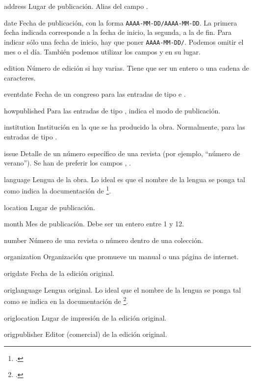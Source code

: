 \begin{choix}
	\item[address]
	Lugar de publicación. Alias del campo .
	\item[date]
	Fecha de publicación, con la forma \verb|AAAA-MM-DD/AAAA-MM-DD|.
	La primera fecha indicada corresponde a la fecha de inicio, la
        segunda, a la de fin. Para indicar sólo una fecha de inicio,
        hay que poner \verb|AAAA-MM-DD/|.
	Podemos omitir el mes o el día. También podemos utilizar los
        campos  y  en su lugar.
   	\item[edition]
	Número de edición si hay varias. Tiene que ser un entero o una
        cadena de caracteres.
      \item[eventdate] Fecha de un congreso para las entradas de tipo
         e .
	\item[howpublished] Para las entradas de tipo ,
          indica el modo de publicación.
   	\item[institution] Institución en la que se ha producido la
          obra. Normalmente, para las entradas de tipo .
   	\item[issue] Detalle de un número específico de una revista
          (por ejemplo, \enquote{número de verano}). Se han de
          preferir los campos , .
   	\item[language] Lengua de la obra. Lo ideal es que el nombre
          de la lengua se ponga tal como indica la documentación de
          \footcite{polyglossia}.
   	\item[location] Lugar de publicación.
   	\item[month] Mes de publicación. Debe ser un entero entre 1 y 12.
   	\item[number] Número de una revista o número dentro de una colección.
   	\item[organization] Organización que promueve un manual o una
          página de internet.
   	\item[origdate] Fecha de la edición original.
   	\item[origlanguage] Lengua original. Lo ideal que el nombre de
          la lengua se ponga tal como se indica en la documentación de
          \footcite{polyglossia}.
   	\item[origlocation] Lugar de impresión de la edición original.
   	\item[origpublisher] Editor (comercial) de la edición original.

\end{choix}
